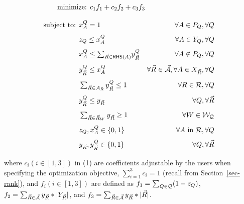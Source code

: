 \vspace{-1ex}
\begin{tcolorbox}
  \begin{alignat}{2}
\hspace{-2.6cm}\text{minimize:
} & c_{1}f_{1}+c_{2}f_{2}+c_{3}f_{3} & \hfill
  \end{alignat}
  
  \vspace{-3.3ex}
  
  \begin{alignat}{2}
   \hspace*{-0.15cm}\text{subject to: }&  x_{A}^{Q} = 1 & \forall
    A\in P_{Q}, \forall Q \\[0.8ex] 
    & z_{Q}\leq x_{A}^{Q} & \forall A \in Y_{Q},\forall Q \\[0.8ex]
    & x_{A}^{Q} \leq\textstyle \sum_{\kb{R}\in \RHS(A)}\!y_{\kb{R}}^{Q} &~\forall
    A\not\in P_{Q}, \forall Q \\[0.8ex]
    & y_{\kb{R}}^{Q} \leq x_{A}^{Q} & \forall \kb{R}\in \kb{\A}, \forall A\in X_{\kb{R}}, \forall
    Q\\[0.8ex]
    & \textstyle \sum_{\kb{R}\in \A_{R}} y_{\kb{R}}^{Q} \leq 1 & 
    \forall R\in \R, \forall Q \\[0.8ex]
    & y_{\kb{R}}^{Q} \leq y_{\kb{R}} & \forall Q, \forall \kb{R} \\[0.8ex]
    & \textstyle\sum_{\kb{R}\in \kb{R}_{W}} y_{\kb{R}} \geq 1 & \forall W\in \Wc_{\Q} \\[0.8ex]
    & z_{Q}, x_{A}^{Q} \in \{0, 1\} & \forall
    A\text{ in }\R, \forall Q\\[0.8ex]
    & y_{\kb{R}}, y_{\kb{R}}^{Q} \in \{0, 1\} & \forall Q, \forall
    \kb{R} 
  \end{alignat}
  \end{tcolorbox}

\vspace{-0.7ex}

\sstab
where $c_{i} (i\in[1, 3])$  in (1) are coefficients adjustable
by the users when specifying the
optimization objective,  $\sum_{i=1}^{3}c_{i} = 1$ (recall
from Section~\ref{sec-rank}), and $f_{i}(i\in [1, 3])$ are defined as
  $f_{1} = \textstyle\sum_{Q\in \mathcal Q} (1-z_{Q})$,
  $f_{2} = \textstyle\sum_{\vec{R}\in \vec{{\mathcal A}}} y_{\vec{R}}*|Y_{\vec{R}}|$,
  and
  $f_{3} = \textstyle\sum_{\vec{R}\in \vec{{\mathcal A}}} y_{\vec{R}}*|\vec{R}|$.


